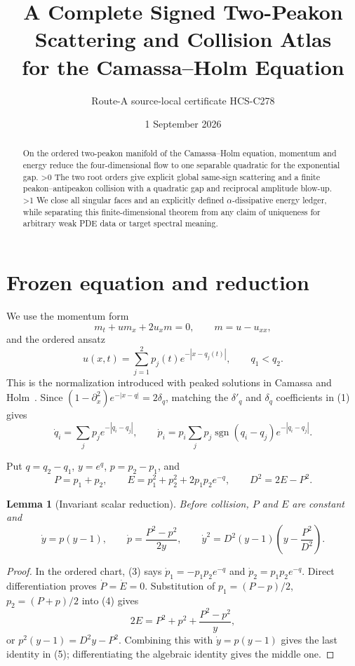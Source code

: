 \documentclass[10pt]{article}
\title{A Complete Signed Two-Peakon Scattering and Collision Atlas\\
for the Camassa--Holm Equation}
\author{Route-A source-local certificate HCS-C278}
\date{1 September 2026}
\providecommand{\CRevisionRound}{2}
\newtheorem{lemma}{Lemma}
\newcommand{\sgn}{\operatorname{sgn}}
\begin{document}
\maketitle

\begin{abstract}
On the ordered two-peakon manifold of the Camassa--Holm equation, momentum
and energy reduce the four-dimensional flow to one separable quadratic for
the exponential gap.
\ifnum\CRevisionRound>0
The two root orders give explicit global same-sign scattering and a finite
peakon--antipeakon collision with a quadratic gap and reciprocal amplitude
blow-up.
\fi
\ifnum\CRevisionRound>1
We close all singular faces and an explicitly defined $\alpha$-dissipative
energy ledger, while separating this finite-dimensional theorem from any
claim of uniqueness for arbitrary weak PDE data or target spectral meaning.
\fi
\end{abstract}

\section{Frozen equation and reduction}
We use the momentum form
\begin{equation}
 m_t+u m_x+2u_xm=0,\qquad m=u-u_{xx},
\end{equation}
and the ordered ansatz
\begin{equation}
 u(x,t)=\sum_{j=1}^2p_j(t)e^{-|x-q_j(t)|},\qquad q_1<q_2.
\end{equation}
This is the normalization introduced with peaked solutions in
Camassa and Holm~\cite{CH1993}.  Since
$(1-\partial_x^2)e^{-|x-q|}=2\delta_q$, matching the $\delta'_q$ and
$\delta_q$ coefficients in (1) gives
\begin{equation}
 \dot q_i=\sum_jp_je^{-|q_i-q_j|},\qquad
 \dot p_i=p_i\sum_jp_j\sgn(q_i-q_j)e^{-|q_i-q_j|}.
\end{equation}

Put $q=q_2-q_1$, $y=e^q$, $p=p_2-p_1$, and
\begin{equation}
 P=p_1+p_2,\qquad
 E=p_1^2+p_2^2+2p_1p_2e^{-q},\qquad D^2=2E-P^2.
\end{equation}

\begin{lemma}[Invariant scalar reduction]\label{lem:red}
Before collision, $P$ and $E$ are constant and
\begin{equation}
 \dot y=p(y-1),\qquad \dot p=\frac{P^2-p^2}{2y},\qquad
 \dot y^2=D^2(y-1)\left(y-\frac{P^2}{D^2}\right).
\end{equation}
\end{lemma}
\begin{proof}
In the ordered chart, (3) says
$\dot p_1=-p_1p_2e^{-q}$ and $\dot p_2=p_1p_2e^{-q}$.
Direct differentiation proves $\dot P=\dot E=0$.  Substitution of
$p_1=(P-p)/2$, $p_2=(P+p)/2$ into (4) gives
\[
 2E=P^2+p^2+\frac{P^2-p^2}{y},
\]
or $p^2(y-1)=D^2y-P^2$.  Combining this with
$\dot y=p(y-1)$ gives the last identity in (5); differentiating the
algebraic identity gives the middle one.
\end{proof}
\end{document}
